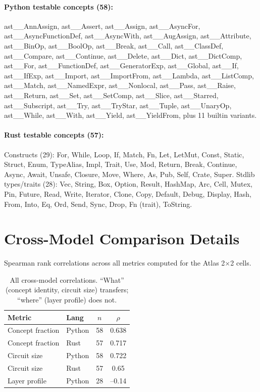 \documentclass[11pt]{article}
\begin{document}
\paragraph{Python testable concepts (58):} ast\_\_AnnAssign, ast\_\_Assert, ast\_\_Assign, ast\_\_AsyncFor, ast\_\_AsyncFunctionDef, ast\_\_AsyncWith, ast\_\_AugAssign, ast\_\_Attribute, ast\_\_BinOp, ast\_\_BoolOp, ast\_\_Break, ast\_\_Call, ast\_\_ClassDef, ast\_\_Compare, ast\_\_Continue, ast\_\_Delete, ast\_\_Dict, ast\_\_DictComp, ast\_\_For, ast\_\_FunctionDef, ast\_\_GeneratorExp, ast\_\_Global, ast\_\_If, ast\_\_IfExp, ast\_\_Import, ast\_\_ImportFrom, ast\_\_Lambda, ast\_\_ListComp, ast\_\_Match, ast\_\_NamedExpr, ast\_\_Nonlocal, ast\_\_Pass, ast\_\_Raise, ast\_\_Return, ast\_\_Set, ast\_\_SetComp, ast\_\_Slice, ast\_\_Starred, ast\_\_Subscript, ast\_\_Try, ast\_\_TryStar, ast\_\_Tuple, ast\_\_UnaryOp, ast\_\_While, ast\_\_With, ast\_\_Yield, ast\_\_YieldFrom, plus 11 builtin variants.

\paragraph{Rust testable concepts (57):} Constructs (29): For, While, Loop, If, Match, Fn, Let, LetMut, Const, Static, Struct, Enum, TypeAlias, Impl, Trait, Use, Mod, Return, Break, Continue, Async, Await, Unsafe, Closure, Move, Where, As, Pub, Self, Crate, Super. Stdlib types/traits (28): Vec, String, Box, Option, Result, HashMap, Arc, Cell, Mutex, Pin, Future, Read, Write, Iterator, Clone, Copy, Default, Debug, Display, Hash, From, Into, Eq, Ord, Send, Sync, Drop, Fn (trait), ToString.

\section{Cross-Model Comparison Details}

Spearman rank correlations across all metrics computed for the Atlas 2$\times$2 cells.

\begin{table}[h]
\centering
\small
\begin{tabular}{llcc}
\toprule
Metric & Lang & $n$ & $\rho$ \\
\midrule
Concept fraction & Python & 58 & 0.638 \\
Concept fraction & Rust   & 57 & 0.717 \\
Circuit size     & Python & 58 & 0.722 \\
Circuit size     & Rust   & 57 & 0.65 \\
Layer profile    & Python & 28 & --0.14 \\
\bottomrule
\end{tabular}
\caption{All cross-model correlations. ``What'' (concept identity, circuit size) transfers; ``where'' (layer profile) does not.}
\end{table}
\end{document}
